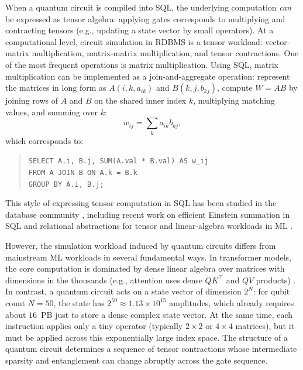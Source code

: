 \medskip
 When a quantum circuit is compiled into SQL, the underlying computation \emph{can} be expressed as tensor algebra:
applying gates corresponds to multiplying and contracting tensors (e.g., updating a state vector by small operators). 
%
At a computational level, circuit simulation in RDBMS  is a tensor workload: vector-matrix multiplication, matrix-matrix multiplication, and tensor contractions. One of the most frequent operations is matrix multiplication. Using SQL, matrix multiplication can be implemented as a join-and-aggregate operation: represent the matrices in long form as $A(i,k,a_{ik})$ and $B(k,j,b_{kj})$, compute $W=AB$ by joining rows of $A$ and $B$ on the shared inner index $k$, multiplying matching values, and summing over $k$:
\[
w_{ij}=\sum_k a_{ik}b_{kj},
\]
which corresponds to:
\begin{quote}\small
\texttt{SELECT A.i, B.j, SUM(A.val * B.val) AS w\_ij\\
FROM A JOIN B ON A.k = B.k\\
GROUP BY A.i, B.j;}
\end{quote}
This style of expressing tensor computation in SQL has been studied in the database community \cite{Khamis2020, boehm2023optimizing, Makrynioti2019survey, zhou2020database, 10107490}, including recent work on efficient Einstein summation in SQL \cite{einsteinSQL2023} and relational abstractions for tensor and linear-algebra workloads in ML \cite{chen2017towards, wang2020spores, luo2021automatic, yuan2021tensor, sun2026transql}. 

However, the simulation workload induced by quantum circuits differs from mainstream ML workloads in several fundamental ways. In transformer models, the core computation is dominated by dense linear algebra over matrices with dimensions in the thousands (e.g., attention uses dense $QK^\top$ and $QV$ products) \cite{vaswani2017attention}. In contrast, a quantum circuit acts on a state vector of dimension $2^{N}$: for qubit count $N=50$, the state has $2^{50}\approx 1.13\times 10^{15}$ amplitudes, which already requires about $16$~PB just to store a dense complex state vector. 
At the same time, each instruction applies only a tiny operator (typically $2\times 2$ or $4\times 4$ matrices), but it must be
applied across this exponentially large index space. 
The   structure of a quantum circuit determines a 
sequence of tensor contractions whose intermediate sparsity and entanglement can change abruptly across the gate sequence. 


